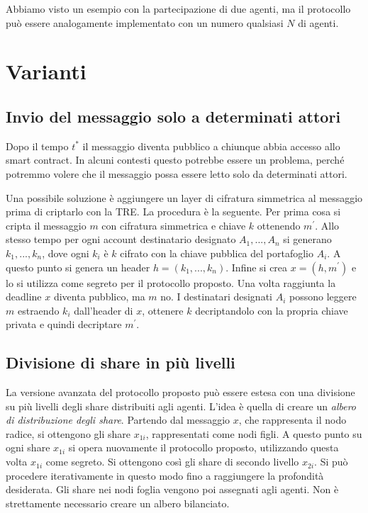 Abbiamo visto un esempio con la partecipazione di due agenti,
ma il protocollo
può essere analogamente implementato con un numero qualsiasi $ N $ di agenti.


\section{Varianti}
\subsection{Invio del messaggio solo a determinati attori}
Dopo il tempo $ t^* $ il messaggio diventa pubblico a chiunque abbia accesso
allo smart contract. In alcuni contesti questo potrebbe essere un problema, perché
potremmo volere che il messaggio possa essere letto solo da determinati attori.

Una possibile soluzione è aggiungere un layer di cifratura simmetrica al messaggio
prima di criptarlo con la TRE.
La procedura è la seguente.
Per prima cosa si cripta il messaggio $ m $ con cifratura simmetrica e chiave $ k $
ottenendo $ m^\prime $. Allo stesso tempo per ogni account destinatario designato
$ A_1, ..., A_n $ si generano $ k_1, ..., k_n $, dove ogni $ k_i $ è $ k $ cifrato con la
chiave pubblica del portafoglio $ A_i $. A questo punto si genera un header
$ h = (k_1, ..., k_n) $. Infine si crea $ x = (h, m^\prime) $ e lo si utilizza come
segreto per il protocollo proposto.
Una volta raggiunta la deadline $ x $ diventa pubblico, ma $ m $ no. I destinatari designati
$ A_i $ possono leggere $ m $ estraendo $ k_i $ dall'header di $ x $, ottenere
$ k $ decriptandolo con la propria chiave privata e quindi decriptare $ m^\prime $.

\subsection{Divisione di share in più livelli}
La versione avanzata del protocollo proposto può essere estesa con una divisione su più livelli
degli share distribuiti agli agenti.
L'idea è quella di creare un \textit{albero di distribuzione degli share}.
Partendo dal messaggio $ x $, che rappresenta il nodo radice, si ottengono gli share $ x_{1i} $,
rappresentati come nodi figli.
A questo punto su ogni share $ x_{1i} $ si opera nuovamente il protocollo proposto,
utilizzando questa volta $ x_{1i} $ come segreto.
Si ottengono così gli share di secondo livello $ x_{2i} $.
Si può procedere iterativamente in questo modo fino a raggiungere la profondità desiderata.
Gli share nei nodi foglia vengono poi assegnati agli agenti.
Non è strettamente necessario creare un albero bilanciato.

